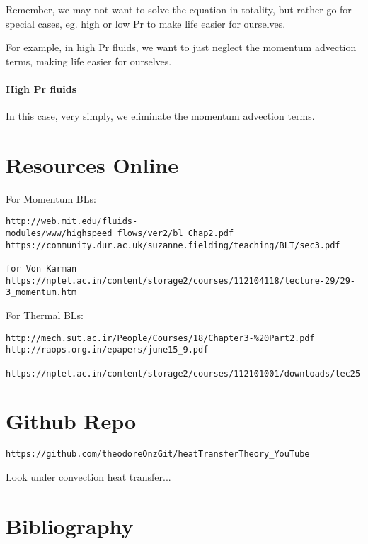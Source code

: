 \documentclass[11pt]{article}
\begin{document}
Remember, we may not want to solve the equation in totality, but rather go for special cases, eg. high or low Pr to make life easier for ourselves.

For example, in high Pr fluids, we want to just neglect the momentum advection terms, making life easier for ourselves. 

\subsection{High Pr fluids}

In this case, very simply, we eliminate the momentum advection terms.


\part{Resources Online}

For Momentum BLs:
\begin{verbatim}
http://web.mit.edu/fluids-modules/www/highspeed_flows/ver2/bl_Chap2.pdf
https://community.dur.ac.uk/suzanne.fielding/teaching/BLT/sec3.pdf

for Von Karman
https://nptel.ac.in/content/storage2/courses/112104118/lecture-29/29-3_momentum.htm
\end{verbatim}

For Thermal BLs:

\begin{verbatim}
http://mech.sut.ac.ir/People/Courses/18/Chapter3-%20Part2.pdf
http://raops.org.in/epapers/june15_9.pdf

https://nptel.ac.in/content/storage2/courses/112101001/downloads/lec25.pdf
\end{verbatim}

\part{Github Repo}
\begin{verbatim}
https://github.com/theodoreOnzGit/heatTransferTheory_YouTube
\end{verbatim}

Look under convection heat transfer...


\part{Bibliography}

\printbibliography
\end{document}
